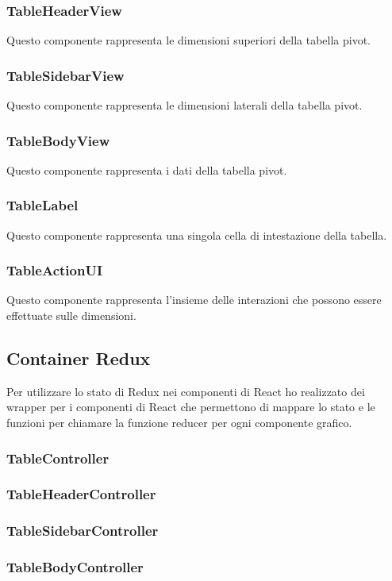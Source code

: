 \subsubsection{TableHeaderView}
Questo componente rappresenta le dimensioni superiori della tabella pivot.

\subsubsection{TableSidebarView}
Questo componente rappresenta le dimensioni laterali della tabella pivot.

\subsubsection{TableBodyView}
Questo componente rappresenta i dati della tabella pivot.

\subsubsection{TableLabel}
Questo componente rappresenta una singola cella di intestazione della tabella.

\subsubsection{TableActionUI}
Questo componente rappresenta l'insieme delle interazioni che possono essere effettuate sulle dimensioni.

\subsection{Container Redux}
Per utilizzare lo stato di Redux nei componenti di React ho realizzato dei wrapper per i componenti di React che permettono di mappare lo stato e le funzioni per chiamare la funzione reducer per ogni componente grafico.
\subsubsection{TableController}
\subsubsection{TableHeaderController}
\subsubsection{TableSidebarController}
\subsubsection{TableBodyController}
